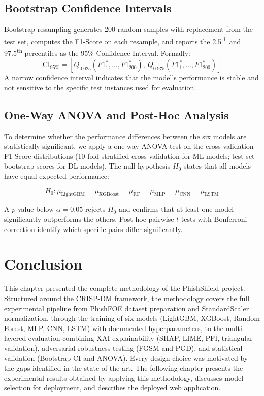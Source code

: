 \subsection{Bootstrap Confidence Intervals}

Bootstrap resampling generates 200 random samples with replacement from the test set, computes the F1-Score on each resample, and reports the 2.5\textsuperscript{th} and 97.5\textsuperscript{th} percentiles as the 95\% Confidence Interval. Formally:
\begin{equation}
    \text{CI}_{95\%} = [Q_{0.025}(F1^*_1, \ldots, F1^*_{200}),\ Q_{0.975}(F1^*_1, \ldots, F1^*_{200})]
\end{equation}
A narrow confidence interval indicates that the model's performance is stable and not sensitive to the specific test instances used for evaluation.

\subsection{One-Way ANOVA and Post-Hoc Analysis}

To determine whether the performance differences between the six models are statistically significant, we apply a one-way ANOVA test on the cross-validation F1-Score distributions (10-fold stratified cross-validation for ML models; test-set bootstrap scores for DL models). The null hypothesis $H_0$ states that all models have equal expected performance:

\begin{equation}
    H_0: \mu_{\text{LightGBM}} = \mu_{\text{XGBoost}} = \mu_{\text{RF}} = \mu_{\text{MLP}} = \mu_{\text{CNN}} = \mu_{\text{LSTM}}
\end{equation}

A $p$-value below $\alpha = 0.05$ rejects $H_0$ and confirms that at least one model significantly outperforms the others. Post-hoc pairwise $t$-tests with Bonferroni correction identify which specific pairs differ significantly.

\section*{Conclusion}

This chapter presented the complete methodology of the PhishShield project. Structured around the CRISP-DM framework, the methodology covers the full experimental pipeline from PhishFOE dataset preparation and StandardScaler normalization, through the training of six models (LightGBM, XGBoost, Random Forest, MLP, CNN, LSTM) with documented hyperparameters, to the multi-layered evaluation combining XAI explainability (SHAP, LIME, PFI, triangular validation), adversarial robustness testing (FGSM and PGD), and statistical validation (Bootstrap CI and ANOVA). Every design choice was motivated by the gaps identified in the state of the art. The following chapter presents the experimental results obtained by applying this methodology, discusses model selection for deployment, and describes the deployed web application.
